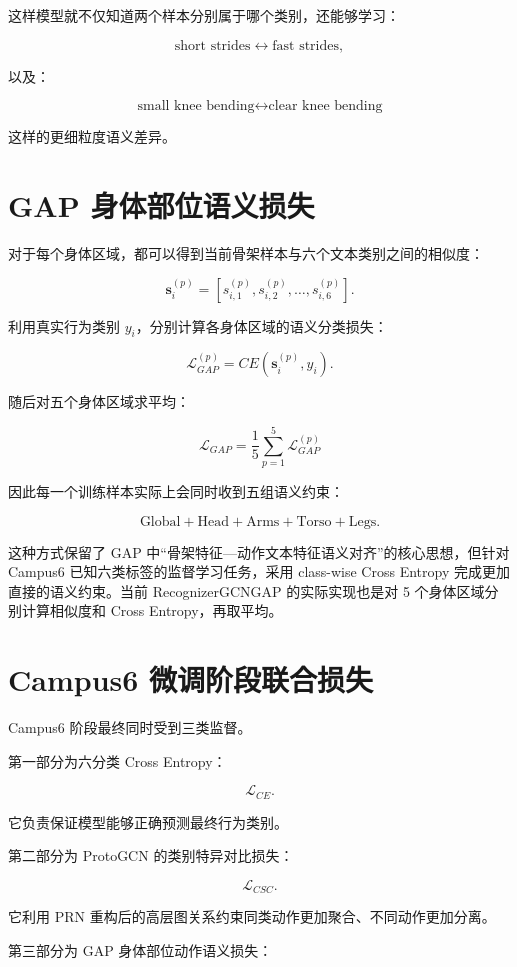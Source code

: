 这样模型就不仅知道两个样本分别属于哪个类别，还能够学习：

\[
\text{short strides}
\leftrightarrow
\text{fast strides},
\]

以及：

\[
\text{small knee bending}
\leftrightarrow
\text{clear knee bending}
\]

这样的更细粒度语义差异。


\section{GAP 身体部位语义损失}

对于每个身体区域，都可以得到当前骨架样本与六个文本类别之间的相似度：

\[
\mathbf s_i^{(p)}
=
[
s_{i,1}^{(p)},
s_{i,2}^{(p)},
\ldots,
s_{i,6}^{(p)}
].
\]

利用真实行为类别 \(y_i\)，分别计算各身体区域的语义分类损失：

\[
\mathcal L_{GAP}^{(p)}
=
CE
(
\mathbf s_i^{(p)},
y_i
).
\]

随后对五个身体区域求平均：

\[
\boxed{
\mathcal L_{GAP}
=
\frac{1}{5}
\sum_{p=1}^{5}
\mathcal L_{GAP}^{(p)}
}
\]

因此每一个训练样本实际上会同时收到五组语义约束：

\[
\text{Global}
+
\text{Head}
+
\text{Arms}
+
\text{Torso}
+
\text{Legs}.
\]

这种方式保留了 GAP 中“骨架特征—动作文本特征语义对齐”的核心思想，但针对 Campus6 已知六类标签的监督学习任务，采用 class-wise Cross Entropy 完成更加直接的语义约束。当前 RecognizerGCNGAP 的实际实现也是对 5 个身体区域分别计算相似度和 Cross Entropy，再取平均。

\section{Campus6 微调阶段联合损失}

Campus6 阶段最终同时受到三类监督。

第一部分为六分类 Cross Entropy：

\[
\mathcal L_{CE}.
\]

它负责保证模型能够正确预测最终行为类别。

第二部分为 ProtoGCN 的类别特异对比损失：

\[
\mathcal L_{CSC}.
\]

它利用 PRN 重构后的高层图关系约束同类动作更加聚合、不同动作更加分离。

第三部分为 GAP 身体部位动作语义损失：


